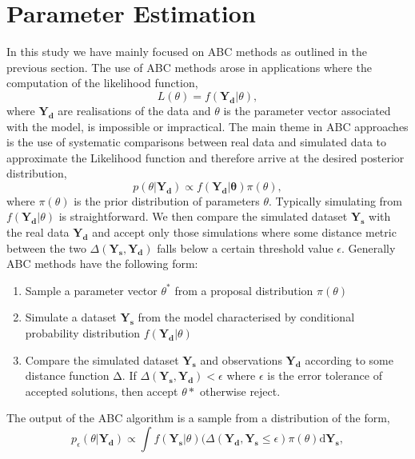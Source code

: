 \chapter{Parameter Estimation}
\ifpdf
    \graphicspath{{Chapter2/Chapter2Figs/PNG/}{Chapter2/Chapter2Figs/PDF/}{Chapter2/Chapter2Figs/}}
\else
    \graphicspath{{Chapter2/Chapter2Figs/EPS/}{Chapter2/Chapter2Figs/}}
\fi

In this study we have mainly focused on ABC methods as outlined in the previous section. The use of ABC methods arose in applications where the computation of the likelihood function,
\begin{equation}
L(\theta) = f(\mathbf{Y_{d}} | \theta),
\end{equation}
where $\mathbf{Y_{d}}$ are realisations of the data and $\theta$ is the parameter vector associated with the model, is impossible or impractical. The main theme in ABC approaches is the use of systematic comparisons between real data and simulated data to approximate the Likelihood function and therefore arrive at the desired posterior distribution,
\begin{equation}
p(\theta|\mathbf{Y_{d}}) \propto f(\mathbf{Y_{d}|\theta})\pi(\theta),
\end{equation}
where $\pi(\theta)$ is the prior distribution of parameters $\theta$. Typically simulating from $f(\mathbf{Y_{d}} | \theta)$ is straightforward. We then compare the simulated dataset $\mathbf{Y_{s}}$ with the real data $\mathbf{Y_{d}}$ and accept only those simulations where some distance metric between the two $\Delta(\mathbf{Y_{s}}, \mathbf{Y_{d}})$ falls below a certain threshold value $\epsilon$.  Generally ABC methods have the following form:
\begin{enumerate}[noitemsep]
\item{Sample a parameter vector $\theta^*$ from a proposal distribution $\pi(\theta) $}
\item{Simulate a dataset $\mathbf{Y_{s}}$ from the model characterised by conditional probability distribution $f(\mathbf{Y_{d}}|\theta)$}
\item{Compare the simulated dataset $\mathbf{Y_{s}}$ and observations $\mathbf{Y_{d}}$ according to some distance function $\mathrm{\Delta}$. If $\Delta(\mathbf{Y_{s}}, \mathbf{Y_{d}}) < \epsilon$ where $\epsilon$ is the error tolerance of accepted solutions, then accept $\theta*$ otherwise reject. }
\end{enumerate}
The output of the ABC algorithm is a sample from a distribution of the form,
\begin{equation}
p_\epsilon(\theta|\mathbf{Y_{d}}) \propto \int f(\mathbf{Y_{s}}|\theta)  (\Delta(\mathbf{Y_{d}}, \mathbf{Y_{s}} \leq \epsilon) \pi(\theta) \mathrm{d}\mathbf{Y_{s}},
\end{equation}
